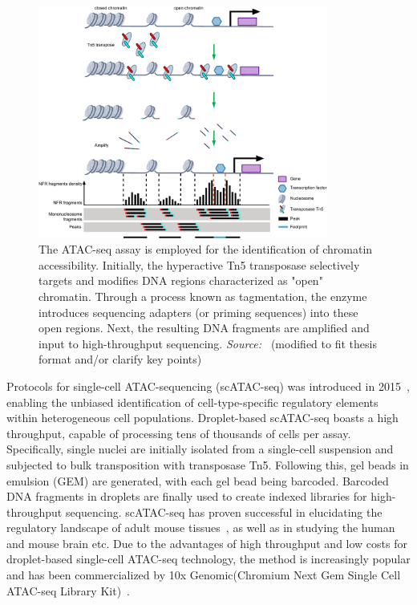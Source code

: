\begin{figure}[!ht]
	\centering
	\includegraphics[width=0.85\textwidth]{scATAC-seq/fig}
	\vspace{0.1cm}
	\caption[ATAC sequenceing schematic flow.]{The ATAC-seq assay is employed for the identification of chromatin accessibility. Initially, the hyperactive Tn5 transposase selectively targets and modifies DNA regions characterized as "open" chromatin. Through a process known as tagmentation, the enzyme introduces sequencing adapters (or priming sequences) into these open regions. Next, the resulting DNA fragments are amplified and input to high-throughput sequencing. \emph{Source:~\cite{yan2020reads}} (modified to fit thesis format and/or clarify key points)}
	\label{fig:ATAC-seq}
\end{figure}

Protocols for single-cell ATAC-sequencing (scATAC-seq) was introduced in 2015~\citep{Buenrostro2015,cusanovich2015multiplex}, enabling the unbiased identification of cell-type-specific regulatory elements within heterogeneous cell populations. Droplet-based scATAC-seq boasts a high throughput, capable of processing tens of thousands of cells per assay. Specifically, single nuclei are initially isolated from a single-cell suspension and subjected to bulk transposition with transposase Tn5. Following this, gel beads in emulsion (GEM) are generated, with each gel bead being barcoded. Barcoded DNA fragments in droplets are finally used to create indexed libraries for high-throughput sequencing. scATAC-seq has proven successful in elucidating the regulatory landscape of adult mouse tissues~\citep{cusanovich2018single}, as well as in studying the human and mouse brain \cite{lake2018humanbrain, sinnamon2019accessible} etc. Due to the advantages of high throughput and low costs for droplet-based single-cell ATAC-seq technology, the method is increasingly popular and has been commercialized by 10x Genomic(Chromium Next Gem Single Cell ATAC-seq Library Kit)~\citep{satpathy2019massively}.



